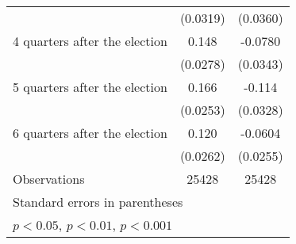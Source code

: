 \begin{table}[htbp]
\begin{tabular}{l*{2}{c}}
                    &    (0.0319)         &    (0.0360)         \\
[1em]
 4 quarters after the election&       0.148\sym{***}&     -0.0780\sym{*}  \\
                    &    (0.0278)         &    (0.0343)         \\
[1em]
 5 quarters after the election&       0.166\sym{***}&      -0.114\sym{***}\\
                    &    (0.0253)         &    (0.0328)         \\
[1em]
 6 quarters after the election&       0.120\sym{***}&     -0.0604\sym{*}  \\
                    &    (0.0262)         &    (0.0255)         \\
\hline
Observations        &       25428         &       25428         \\
\hline\hline
\multicolumn{3}{l}{\footnotesize Standard errors in parentheses}\\
\multicolumn{3}{l}{\footnotesize \sym{*} \(p<0.05\), \sym{**} \(p<0.01\), \sym{***} \(p<0.001\)}\\
\end{tabular}
\end{table}
